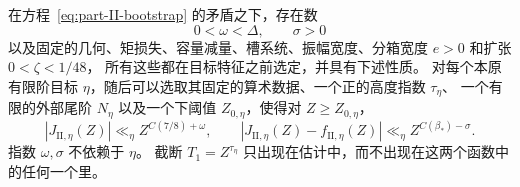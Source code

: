 \begin{proposition}[选择次序]\label{prop:parameter-order}
在方程~\eqref{eq:part-II-bootstrap} 的矛盾之下，存在数
\[
 0<\omega<\Delta,\qquad \sigma>0
\]
以及固定的几何、矩损失、容量减量、槽系统、振幅宽度、分箱宽度 \(e>0\) 和扩张 \(0<\zeta<1/48\)，
所有这些都在目标特征之前选定，并具有下述性质。
对每个本原有限阶目标 \(\eta\)，随后可以选取其固定的算术数据、一个正的高度指数 \(\tau_\eta\)、
一个有限的外部尾阶 \(N_\eta\) 以及一个下阈值 \(Z_{0,\eta}\)，使得对 \(Z\ge Z_{0,\eta}\)，
\[
 |J_{\mathrm{II},\eta}(Z)|\ll_\eta Z^{C(7/8)+\omega},\qquad
 |J_{\mathrm{II},\eta}(Z)-f_{\mathrm{II},\eta}(Z)|
 \ll_\eta Z^{C(\beta_*)-\sigma}.
\]
指数 \(\omega,\sigma\) 不依赖于 \(\eta\)。
截断 \(T_1=Z^{\tau_\eta}\) 只出现在估计中，而不出现在这两个函数中的任何一个里。
\end{proposition}

